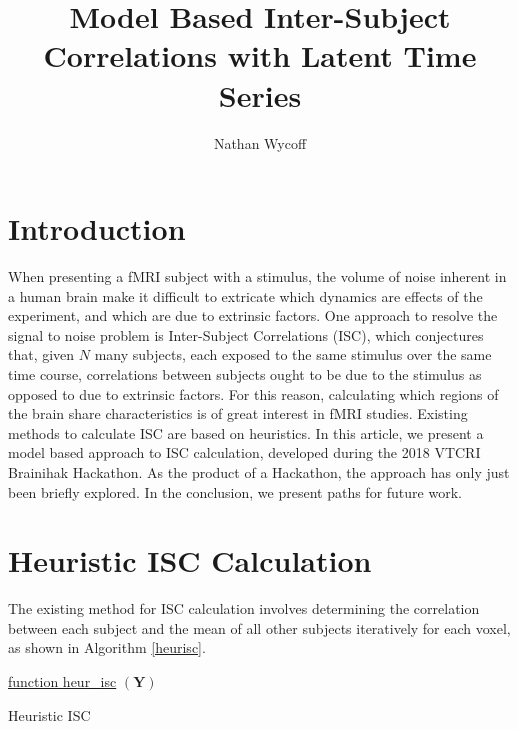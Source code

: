 \documentclass[a4paper]{article}
\title
{Model Based Inter-Subject Correlations with Latent Time Series}
\author{Nathan Wycoff}
\begin{document}
\maketitle

\section{Introduction}

When presenting a fMRI subject with a stimulus, the volume of noise inherent in a human brain make it difficult to extricate which dynamics are effects of the experiment, and which are due to extrinsic factors. One approach to resolve the signal to noise problem is Inter-Subject Correlations (ISC), which conjectures that, given $N$ many subjects, each exposed to the same stimulus over the same time course, correlations between subjects ought to be due to the stimulus as opposed to due to extrinsic factors. For this reason, calculating which regions of the brain share characteristics is of great interest in fMRI studies. Existing methods to calculate ISC are based on heuristics. In this article, we present a model based approach to ISC calculation, developed during the 2018 VTCRI Brainihak Hackathon. As the product of a Hackathon, the approach has only just been briefly explored. In the conclusion, we present paths for future work.

\section{Heuristic ISC Calculation}

The existing method for ISC calculation involves determining the correlation between each subject and the mean of all other subjects iteratively for each voxel, as shown in Algorithm \ref{heurisc}.

\begin{algorithm}
    \label{heurisc}

    \underline{function heur\_isc} $(\mathbf{Y})$\;

    \caption{Heuristic ISC}
\end{algorithm}
\end{document}
